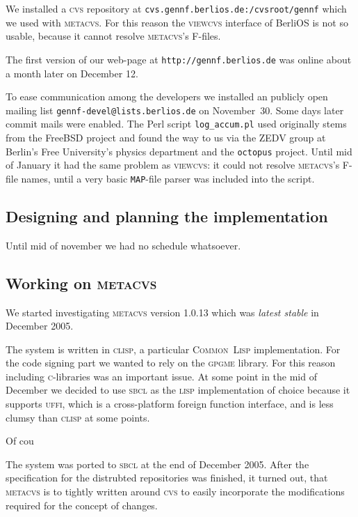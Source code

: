 \documentclass[fleqn, 10pt, a4paper]{report}
\begin{document}
We installed a \textsc{cvs} repository at
\texttt{cvs.gennf.berlios.de:/cvsroot/gennf} which we used
with \textsc{metacvs}. For this reason the \textsc{viewcvs}
interface of BerliOS is not so usable, because it cannot resolve
\textsc{metacvs}'s F-files.

The first version of our web-page at \texttt{http://gennf.berlios.de}
was online about a month later on December 12.

To ease communication among the developers we installed an publicly
open mailing list \texttt{gennf-devel@lists.berlios.de} on
November~30. Some days later commit mails were enabled.
The Perl script \texttt{log\_accum.pl} used
originally stems from the FreeBSD project and found the
way to us via the ZEDV group at Berlin's Free University's physics
department and the \texttt{octopus} project. Until mid of January
it had the same problem as \textsc{viewcvs}: it could not resolve
\textsc{metacvs}'s F-file names, until a very basic \texttt{MAP}-file
parser was included into the script.


\subsection{Designing and planning the implementation}

Until mid of november we had no schedule whatsoever.

\subsection{Working on \textsc{metacvs}}

We started investigating \textsc{metacvs} version 1.0.13 which was
\emph{latest stable} in December 2005.

The system is written in \textsc{clisp}, a particular
\textsc{Common~Lisp} implementation. For the code signing part
we wanted to rely on the \textsc{gpgme} library. For this reason
including \textsc{c}-libraries was an important issue. At some point
in the mid of December we decided to use \textsc{sbcl} as the
\textsc{lisp} implementation of choice because it supports
\textsc{uffi}, which is a cross-platform foreign function interface,
and is less clumsy than \textsc{clisp} at some points.

Of cou

The system was ported to \textsc{sbcl} at the end of December 2005.
After the specification for the distrubted repositories was finished,
it turned out, that \textsc{metacvs} is to tightly written around
\textsc{cvs} to easily incorporate the modifications required
for the concept of changes.
\end{document}
